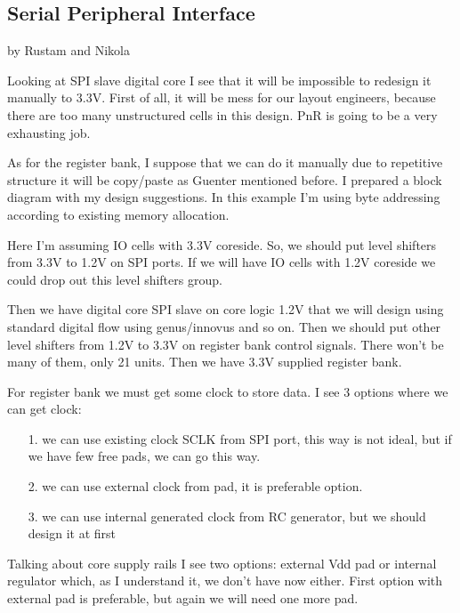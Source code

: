 
\subsection{Serial Peripheral Interface} 

by Rustam and Nikola

Looking at SPI slave digital core I see that it will be impossible to redesign it manually to 3.3V. First of all, it will be mess for our layout engineers, because there are too many unstructured cells in this design. PnR is going to be a very exhausting job.

As for the register bank, I suppose that we can do it manually due to repetitive structure it will be copy/paste as Guenter mentioned before.
I prepared a block diagram with my design suggestions. In this example I'm using byte addressing according to existing memory allocation.
 
Here I'm assuming IO cells with 3.3V coreside. So, we should put level shifters from 3.3V to 1.2V on SPI ports. If we will have IO cells with 1.2V coreside we could drop out this level shifters group.

Then we have digital core SPI slave on core logic 1.2V that we will design using standard digital flow using genus/innovus and so on. Then we should put other level shifters from 1.2V to 3.3V on register bank control signals. There won't be many of them, only 21 units. Then we have 3.3V supplied register bank.

For register bank we must get some clock to store data. I see 3 options where we can get clock: 

\begin{itemize}
	\item [1.] we can use existing clock SCLK from SPI port, this way is not ideal, but if we have few free pads, we can go this way.
	\item [2.] we can use external clock from pad, it is preferable option.
	\item [3.] we can use internal generated clock from RC generator, but we should design it at first
\end{itemize}

Talking about core supply rails I see two options: external Vdd pad or internal regulator which, as I understand it, we don't have now either. 
First option with external pad is preferable, but again we will need one more pad.

